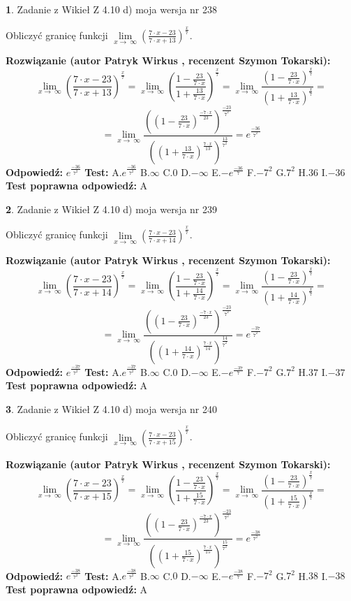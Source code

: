 \documentclass[12pt, a4paper]{article}
\theoremstyle{definition} %
\newtheorem{zad}{}
\newcommand{\zadStart}[1]{\begin{zad}#1\newline}
\newcommand{\zadStop}{\end{zad}}
\newcommand{\rozwStart}[2]{\noindent \textbf{Rozwiązanie (autor #1 , recenzent #2): }\newline}
\newcommand{\rozwStop}{\newline}
\newcommand{\odpStart}{\noindent \textbf{Odpowiedź:}\newline}
\newcommand{\odpStop}{\newline}
\newcommand{\testStart}{\noindent \textbf{Test:}\newline}
\newcommand{\testStop}{\newline}
\newcommand{\kluczStart}{\noindent \textbf{Test poprawna odpowiedź:}\newline}
\newcommand{\kluczStop}{\newline}
\begin{document}
\zadStart{Zadanie z Wikieł Z 4.10 d) moja wersja nr 238}


Obliczyć granicę funkcji  $\lim\limits_{x\to\ \infty}(\frac{7\cdot x-23}{7\cdot x+13})^{\frac{x}{7}}$.
\zadStop
\rozwStart{Patryk Wirkus}{Szymon Tokarski}
$$\lim\limits_{x\to\ \infty}(\frac{7\cdot x-23}{7\cdot x+13})^{\frac{x}{7}} = \lim\limits_{x\to\ \infty}(\frac{1-\frac{23}{7\cdot x}}{1+\frac{13}{7\cdot x}})^{\frac{x}{7}}=\lim\limits_{x\to\ \infty}\frac{(1-\frac{23}{7\cdot x})^{\frac{x}{7}}}{(1+\frac{13}{7\cdot x})^{\frac{x}{7}}}=$$
$$=\lim\limits_{x\to\ \infty}\frac{((1-\frac{23}{7\cdot x})^{\frac{-7\cdot x}{23}})^{\frac{-23}{7^{2}}}}{((1+\frac{13}{7\cdot x})^{\frac{7\cdot x}{13}})^{\frac{13}{7^{2}}}}=e^{\frac{-36}{7^{2}}}$$
\rozwStop
\odpStart
$e^{\frac{-36}{7^{2}}}$
\odpStop
\testStart
A.$e^{\frac{-36}{7^{2}}}$ B.$\infty$ C.$0$ D.$-\infty$ E.$-e^{\frac{-36}{7}}$
F.$-7^{2}$ G.$7^{2}$
H.$36$
I.$-36$
\testStop
\kluczStart
A
\kluczStop



\zadStart{Zadanie z Wikieł Z 4.10 d) moja wersja nr 239}


Obliczyć granicę funkcji  $\lim\limits_{x\to\ \infty}(\frac{7\cdot x-23}{7\cdot x+14})^{\frac{x}{7}}$.
\zadStop
\rozwStart{Patryk Wirkus}{Szymon Tokarski}
$$\lim\limits_{x\to\ \infty}(\frac{7\cdot x-23}{7\cdot x+14})^{\frac{x}{7}} = \lim\limits_{x\to\ \infty}(\frac{1-\frac{23}{7\cdot x}}{1+\frac{14}{7\cdot x}})^{\frac{x}{7}}=\lim\limits_{x\to\ \infty}\frac{(1-\frac{23}{7\cdot x})^{\frac{x}{7}}}{(1+\frac{14}{7\cdot x})^{\frac{x}{7}}}=$$
$$=\lim\limits_{x\to\ \infty}\frac{((1-\frac{23}{7\cdot x})^{\frac{-7\cdot x}{23}})^{\frac{-23}{7^{2}}}}{((1+\frac{14}{7\cdot x})^{\frac{7\cdot x}{14}})^{\frac{14}{7^{2}}}}=e^{\frac{-37}{7^{2}}}$$
\rozwStop
\odpStart
$e^{\frac{-37}{7^{2}}}$
\odpStop
\testStart
A.$e^{\frac{-37}{7^{2}}}$ B.$\infty$ C.$0$ D.$-\infty$ E.$-e^{\frac{-37}{7}}$
F.$-7^{2}$ G.$7^{2}$
H.$37$
I.$-37$
\testStop
\kluczStart
A
\kluczStop



\zadStart{Zadanie z Wikieł Z 4.10 d) moja wersja nr 240}


Obliczyć granicę funkcji  $\lim\limits_{x\to\ \infty}(\frac{7\cdot x-23}{7\cdot x+15})^{\frac{x}{7}}$.
\zadStop
\rozwStart{Patryk Wirkus}{Szymon Tokarski}
$$\lim\limits_{x\to\ \infty}(\frac{7\cdot x-23}{7\cdot x+15})^{\frac{x}{7}} = \lim\limits_{x\to\ \infty}(\frac{1-\frac{23}{7\cdot x}}{1+\frac{15}{7\cdot x}})^{\frac{x}{7}}=\lim\limits_{x\to\ \infty}\frac{(1-\frac{23}{7\cdot x})^{\frac{x}{7}}}{(1+\frac{15}{7\cdot x})^{\frac{x}{7}}}=$$
$$=\lim\limits_{x\to\ \infty}\frac{((1-\frac{23}{7\cdot x})^{\frac{-7\cdot x}{23}})^{\frac{-23}{7^{2}}}}{((1+\frac{15}{7\cdot x})^{\frac{7\cdot x}{15}})^{\frac{15}{7^{2}}}}=e^{\frac{-38}{7^{2}}}$$
\rozwStop
\odpStart
$e^{\frac{-38}{7^{2}}}$
\odpStop
\testStart
A.$e^{\frac{-38}{7^{2}}}$ B.$\infty$ C.$0$ D.$-\infty$ E.$-e^{\frac{-38}{7}}$
F.$-7^{2}$ G.$7^{2}$
H.$38$
I.$-38$
\testStop
\kluczStart
A
\kluczStop
\end{document}
